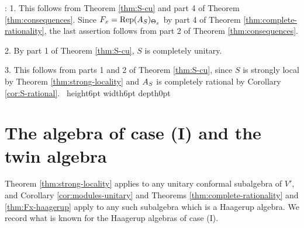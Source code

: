 \documentclass[leqno]{article}
\let\cal\relax
\newcommand{\cal}{\mathcal}
\newcommand{\qed}{\hfill \vrule height6pt  width6pt depth0pt}
\DeclareMathOperator{\Rep}{Rep} %
\newenvironment{proof}[1][]{\noindent {\it Proof #1} : }{\hbox{~}\qed
\smallskip
}
\numberwithin{equation}{section}
\begin{document}
\begin{proof}
1. This follows from Theorem \ref{thm:S-cu} and part 4 of Theorem \ref{thm:consequences}. Since $\cal F_x = \Rep(\cal A_S)_{\Theta_x}$ by part 4 of Theorem \ref{thm:complete-rationality}, the last assertion follows from part 2 of Theorem \ref{thm:consequences}.

2. By part 1 of Theorem \ref{thm:S-cu}, $S$ is completely unitary.

3. This follows from parts 1 and 2 of Theorem \ref{thm:S-cu}, since $S$ is strongly local by Theorem \ref{thm:strong-locality} and $\cal A_S$ is completely rational by Corollary \ref{cor:S-rational}.
\end{proof}


\section{The algebra of case (I) and the twin algebra}
\label{sec:case-I}

Theorem \ref{thm:strong-locality} applies to any unitary conformal subalgebra of $V'$, and Corollary \ref{cor:modules-unitary} and Theorems \ref{thm:complete-rationality} and \ref{thm:Fx-haagerup} apply to any such subalgebra which is a Haagerup algebra. We record what is known for the Haagerup algebras of case (I).
\end{document}
